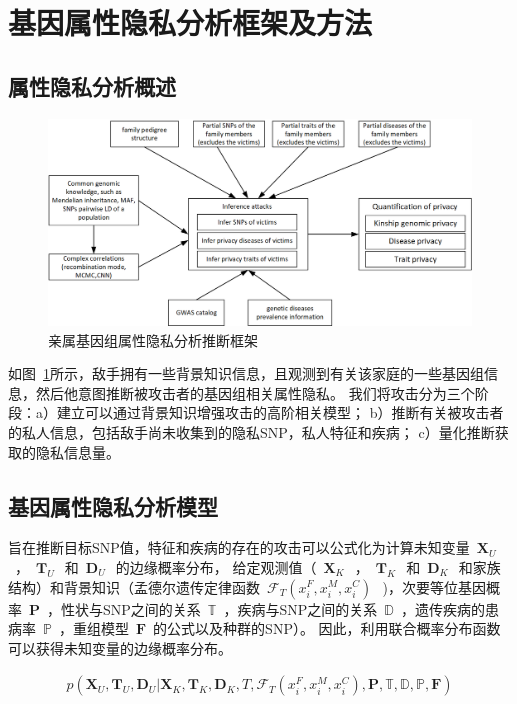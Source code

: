 \section{基因属性隐私分析框架及方法}
\label{sec:inference-attack}

\subsection{属性隐私分析概述}

\begin{figure}[htbp]
	\centering
	\includegraphics[width=0.95\linewidth]{./figures/attack-framework.png}
	\centering
	\caption{亲属基因组属性隐私分析推断框架}\label{fig:attack-framework}
\end{figure}

如图~\ref{fig:attack-framework}所示，敌手拥有一些背景知识信息，且观测到有关该家庭的一些基因组信息，然后他意图推断被攻击者的基因组相关属性隐私。 我们将攻击分为三个阶段：a）建立可以通过背景知识增强攻击的高阶相关模型； b）推断有关被攻击者的私人信息，包括敌手尚未收集到的隐私SNP，私人特征和疾病； c）量化推断获取的隐私信息量。

\subsection{基因属性隐私分析模型}
旨在推断目标SNP值，特征和疾病的存在的攻击可以公式化为计算未知变量~$\mathbf{X}_U~$~，~$\mathbf{T}_U~$~和~$\mathbf{D}_U~$~的边缘概率分布，
给定观测值（~$\mathbf{X}_K~$~，~$\mathbf{T}_K~$~和~$\mathbf{D}_K~$~和家族结构）和背景知识（孟德尔遗传定律函数~$\mathcal{F}_T(x_i^F,x_i^M,x_i^C)~$~)，次要等位基因概率~$\mathbf{P}$~，性状与SNP之间的关系~$\mathbb{T}$~，疾病与SNP之间的关系~$\mathbb{D}$~，遗传疾病的患病率~$\mathbb{P}$~，重组模型~$\mathbf{F}$~的公式以及种群的SNP）。 因此，利用联合概率分布函数可以获得未知变量的边缘概率分布。

\begin{equation}\label{eq:joint-pro}
\begin{aligned}
p(\mathbf{X}_U, \mathbf{T}_U, \mathbf{D}_U | \mathbf{X}_K, \mathbf{T}_K, \mathbf{D}_K, T, \mathcal{F}_T(x_i^F,x_i^M,x_i^C), \mathbf{P}, \mathbb{T}, \mathbb{D}, \mathbb{P}, \mathbf{F})
\end{aligned}
\end{equation}

